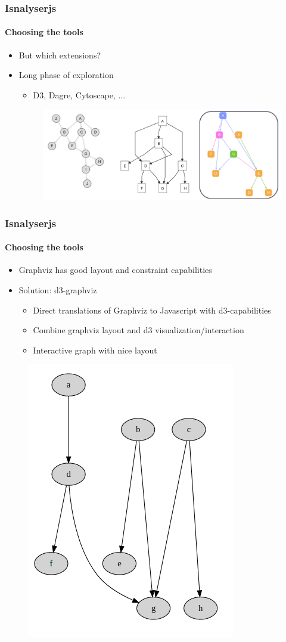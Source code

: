 \documentclass[9pt]{beamer}
\begin{document}
\begin{frame}
\frametitle{Isnalyserjs}
\framesubtitle{Choosing the tools}
\begin{itemize}%
	\item But which extensions?
	\item Long phase of exploration
	\begin{itemize}
		\item D3, Dagre, Cytoscape, ...
	\end{itemize}
	\begin{figure}
		\flushleft
		\includegraphics[width=1\linewidth]{figures/js_libs_3.pdf}
	\end{figure}
\end{itemize}
\end{frame} 


\begin{frame}
\frametitle{Isnalyserjs}
\framesubtitle{Choosing the tools}
\begin{itemize}%
	\item Graphviz has good layout and constraint capabilities
	\item Solution: d3-graphviz
	\begin{itemize}
		\item Direct translations of Graphviz to Javascript with d3-capabilities
		\item Combine graphviz layout and d3 visualization/interaction 
		\item Interactive graph with nice layout
	\end{itemize}
\end{itemize}
	\begin{figure}
	\flushright
	\includegraphics[width=.42\linewidth]{figures/d3_graphviz.png}
\end{figure}
\end{frame} 
\end{document}
